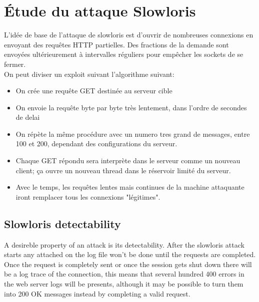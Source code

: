 \documentclass{article}
\begin{document}
\section{Étude du attaque Slowloris}
L'idée de base de l'attaque de slowloris est d'ouvrir de nombreuses connexions en envoyant des requêtes HTTP partielles. Des fractions de la demande sont envoyées ultérieurement à intervalles réguliers pour empêcher les sockets de se fermer. \\
On peut diviser un exploit suivant l'algorithme suivant: \\
\begin{itemize}
	\item On crée une requête GET destinée au serveur cible
	\item On envoie la requête byte par byte très lentement, dans l'ordre de secondes de delai
	\item On répète la même procédure avec un numero tres grand de messages, entre 100 et 200, dependant des configurations du serveur.
	\item Chaque GET répondu sera interprète dans le serveur comme un nouveau client; ça ouvre un nouveau thread dans le réservoir limité du serveur.
	\item Avec le temps, les requêtes lentes mais continues de la machine attaquante iront remplacer tous les connexions "légitimes".
\end{itemize}

\subsection{Slowloris detectability}
A desireble property of an attack is its detectability. After the slowloris attack starts any attached on the log file won't be done until the requests are completed. Once the request is completely sent or once the session gets shut down there will be a log trace of the connection, this means that several hundred 400 errors in the web server logs will be presents,  although it may be possible to turn them into 200 OK messages instead by completing a valid request.

\end{document}

